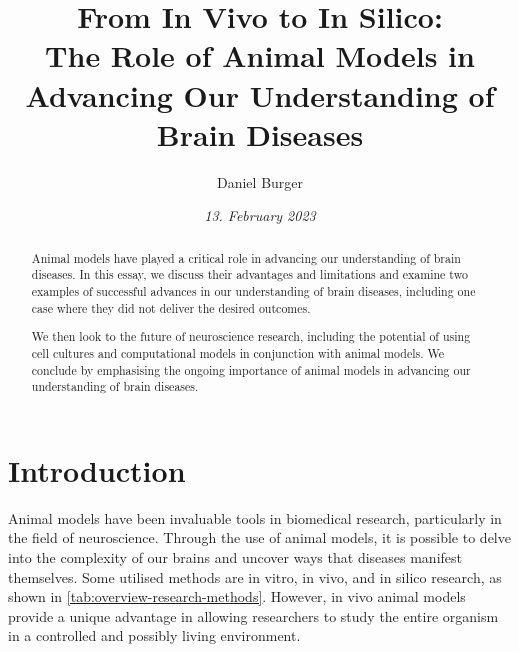 \documentclass[10pt]{article}
\title{\textbf{From In Vivo to In Silico:} \\ The Role of Animal Models in Advancing Our Understanding of Brain Diseases}
\author[ ]{Daniel Burger}
\affil[ ]{\textbf{King's College London}}
\affil[ ]{\href{mailto:daniel.burger@kcl.ac.uk}{daniel.burger@kcl.ac.uk}}
\date{\textit{13. February 2023}}
\begin{document}

\maketitle
\thispagestyle{empty}

\begin{sloppypar} %
  \begin{abstract}
    Animal models have played a critical role in advancing our understanding of brain diseases. In this essay, we discuss their advantages and limitations and examine two examples of successful advances in our understanding of brain diseases, including one case where they did not deliver the desired outcomes.

    We then look to the future of neuroscience research, including the potential of using cell cultures and computational models in conjunction with animal models. We conclude by emphasising the ongoing importance of animal models in advancing our understanding of brain diseases.

  \end{abstract}
  \pagebreak

  \tableofcontents
  \pagebreak

  \listoffigures
  \listoftables
  \pagebreak


  \doublespacing

  \section{Introduction}
  \label{sec:introduction}

  Animal models have been invaluable tools in biomedical research, particularly in the field of neuroscience. Through the use of animal models, it is possible to delve into the complexity of our brains and uncover ways that diseases manifest themselves. Some utilised methods are in vitro, in vivo, and in silico research, as shown in \autoref{tab:overview-research-methods}. However, in vivo animal models provide a unique advantage in allowing researchers to study the entire organism in a controlled and possibly living environment.


\end{sloppypar}
\end{document}
